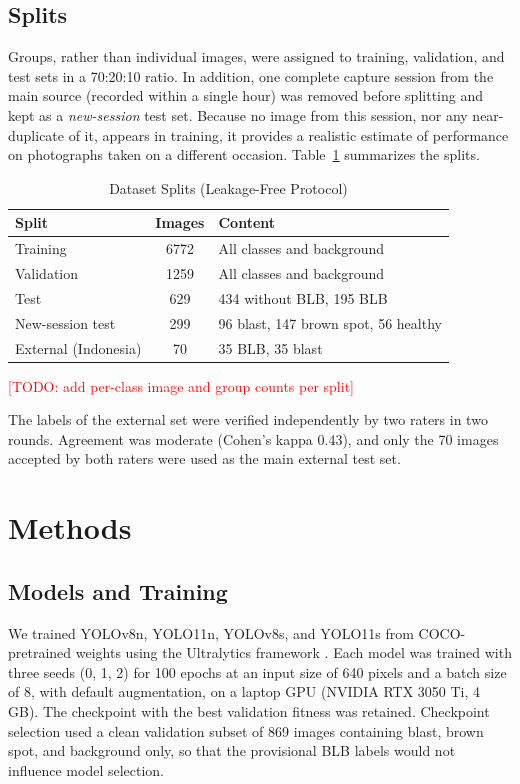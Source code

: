 \documentclass[conference]{IEEEtran}
\newcommand{\todo}[1]{\textcolor{red}{[TODO: #1]}}
\begin{document}
\subsection{Splits}
Groups, rather than individual images, were assigned to training, validation, and test sets in a 70:20:10 ratio. In addition, one complete capture session from the main source (recorded within a single hour) was removed before splitting and kept as a \emph{new-session} test set. Because no image from this session, nor any near-duplicate of it, appears in training, it provides a realistic estimate of performance on photographs taken on a different occasion. Table~\ref{tab:data} summarizes the splits.

\begin{table}[htbp]
\caption{Dataset Splits (Leakage-Free Protocol)}
\begin{center}
\setlength{\tabcolsep}{4pt}
\begin{tabular}{|l|c|p{3.6cm}|}
\hline
\textbf{Split} & \textbf{Images} & \textbf{Content} \\
\hline
Training & 6772 & All classes and background \\
Validation & 1259 & All classes and background \\
Test & 629 & 434 without BLB, 195 BLB \\
New-session test & 299 & 96 blast, 147 brown spot, 56 healthy \\
External (Indonesia) & 70 & 35 BLB, 35 blast \\
\hline
\end{tabular}
\par\vspace{2pt}\todo{add per-class image and group counts per split}
\label{tab:data}
\end{center}
\end{table}

The labels of the external set were verified independently by two raters in two rounds. Agreement was moderate (Cohen's kappa 0.43), and only the 70 images accepted by both raters were used as the main external test set.

\section{Methods}

\subsection{Models and Training}
We trained YOLOv8n, YOLO11n, YOLOv8s, and YOLO11s from COCO-pretrained weights \cite{lin2014} using the Ultralytics framework \cite{ultralytics_v8,ultralytics_11}. Each model was trained with three seeds (0, 1, 2) for 100 epochs at an input size of 640 pixels and a batch size of 8, with default augmentation, on a laptop GPU (NVIDIA RTX 3050 Ti, 4 GB). The checkpoint with the best validation fitness was retained. Checkpoint selection used a clean validation subset of 869 images containing blast, brown spot, and background only, so that the provisional BLB labels would not influence model selection.
\end{document}

